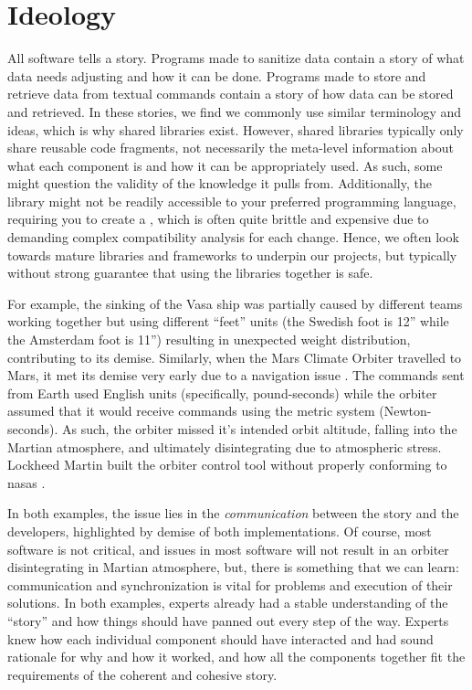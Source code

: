 \chapter[Ideology]{Ideology\footnotemark}
\label{chap:ideology}

All software tells a story. Programs made to sanitize data contain a story of
what data needs adjusting and how it can be done. Programs made to store and
retrieve data from textual commands contain a story of how data can be stored
and retrieved. In these stories, we find we commonly use similar terminology and
ideas, which is why shared libraries exist. However, shared libraries typically
only share reusable code fragments, not necessarily the meta-level information
about what each component is and how it can be appropriately used. As such, some
might question the validity of the knowledge it pulls from. Additionally, the
library might not be readily accessible to your preferred programming language,
requiring you to create a , which is often quite brittle and expensive
due to demanding complex compatibility analysis for each change. Hence, we often
look towards mature libraries and frameworks to underpin our projects, but
typically without strong guarantee that using the libraries together is safe.

For example, the sinking of the Vasa ship \cite{wiki:Vasa_ship} was partially
caused by different teams working together but using different ``feet'' units
(the Swedish foot is 12'' while the Amsterdam foot is 11'') resulting in
unexpected weight distribution, contributing to its demise. Similarly, when the
Mars Climate Orbiter travelled to Mars, it met its demise very early due to a
navigation issue \cite{Siddiqi2018}. The commands sent from Earth used English
units (specifically, pound-seconds) while the orbiter assumed that it would
receive commands using the metric system (Newton-seconds). As such, the orbiter
missed it's intended orbit altitude, falling into the Martian atmosphere, and
ultimately disintegrating due to atmospheric stress. Lockheed Martin built the
orbiter control tool without properly conforming to \acsp{nasa} .

In both examples, the issue lies in the \textit{communication} between the story
and the developers, highlighted by demise of both implementations. Of course,
most software is not critical, and issues in most software will not result in an
orbiter disintegrating in Martian atmosphere, but, there is something that we
can learn: communication and synchronization is vital for problems and execution
of their solutions. In both examples, experts already had a stable understanding
of the ``story'' and how things should have panned out every step of the way.
Experts knew how each individual component should have interacted and had sound
rationale for why and how it worked, and how all the components together fit the
requirements of the coherent and cohesive story.

